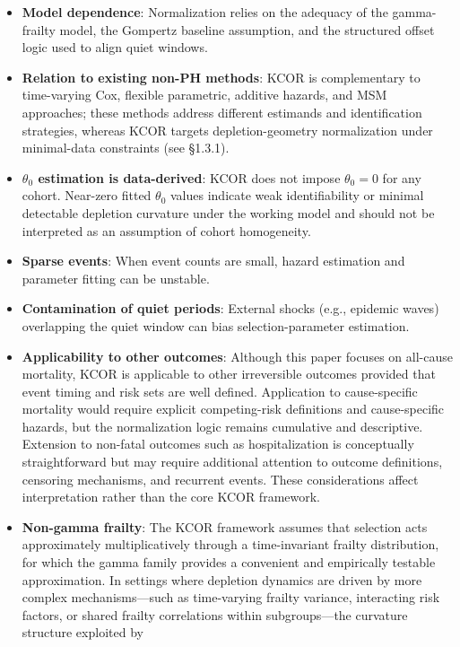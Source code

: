 \documentclass[
]{article}
\providecommand{\tightlist}{%
  \setlength{\itemsep}{0pt}\setlength{\parskip}{0pt}}
\begin{document}
\begin{itemize}
\tightlist
\item
  \textbf{Model dependence}: Normalization relies on the adequacy of the
  gamma-frailty model, the Gompertz baseline assumption, and the
  structured offset logic used to align quiet windows.
\item
  \textbf{Relation to existing non-PH methods}: KCOR is complementary to
  time-varying Cox, flexible parametric, additive hazards, and MSM
  approaches; these methods address different estimands and
  identification strategies, whereas KCOR targets depletion-geometry
  normalization under minimal-data constraints (see §1.3.1).
\item
  \textbf{\(\theta_0\) estimation is data-derived}: KCOR does not impose
  \(\theta_0 = 0\) for any cohort. Near-zero fitted \(\theta_0\) values
  indicate weak identifiability or minimal detectable depletion
  curvature under the working model and should not be interpreted as an
  assumption of cohort homogeneity.
\item
  \textbf{Sparse events}: When event counts are small, hazard estimation
  and parameter fitting can be unstable.
\item
  \textbf{Contamination of quiet periods}: External shocks (e.g.,
  epidemic waves) overlapping the quiet window can bias
  selection-parameter estimation.
\item
  \textbf{Applicability to other outcomes}: Although this paper focuses
  on all-cause mortality, KCOR is applicable to other irreversible
  outcomes provided that event timing and risk sets are well defined.
  Application to cause-specific mortality would require explicit
  competing-risk definitions and cause-specific hazards, but the
  normalization logic remains cumulative and descriptive. Extension to
  non-fatal outcomes such as hospitalization is conceptually
  straightforward but may require additional attention to outcome
  definitions, censoring mechanisms, and recurrent events. These
  considerations affect interpretation rather than the core KCOR
  framework.
\item
  \textbf{Non-gamma frailty}: The KCOR framework assumes that selection
  acts approximately multiplicatively through a time-invariant frailty
  distribution, for which the gamma family provides a convenient and
  empirically testable approximation. In settings where depletion
  dynamics are driven by more complex mechanisms---such as time-varying
  frailty variance, interacting risk factors, or shared frailty
  correlations within subgroups---the curvature structure exploited by

\end{itemize}
\end{document}
